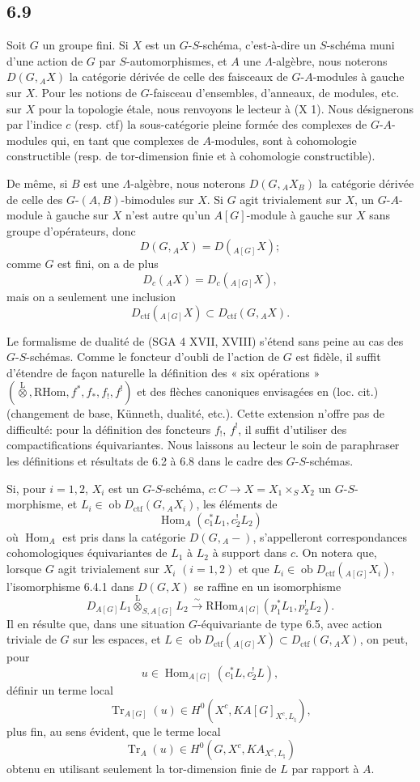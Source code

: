\documentclass[11pt]{article}
\DeclareMathOperator{\Hom}{Hom}
\providecommand{\RHom}{\mathrm{RHom}}
\providecommand{\Tr}{\operatorname{Tr}}
\providecommand{\Tr}{\operatorname{Tr}}
\providecommand{\lten}{\overset{\mathrm L}{\otimes}}
\providecommand{\Ob}{\operatorname{ob}}
\providecommand{\Tr}{\operatorname{Tr}}
\providecommand{\RHom}{\mathrm{RHom}}
\providecommand{\Hom}{\operatorname{Hom}}
\providecommand{\lten}{\overset{\mathrm L}{\otimes}}
\providecommand{\RHom}{\mathrm R\mathcal{H}om}
\providecommand{\lten}{\overset{\mathrm L}{\otimes}}
\providecommand{\Ob}{\operatorname{ob}}
\providecommand{\Tr}{\operatorname{Tr}}
\providecommand{\lten}{\overset{\mathrm L}{\otimes}}
\providecommand{\lten}{\overset{\mathrm L}{\otimes}}
\providecommand{\Ob}{\operatorname{Ob}}
\providecommand{\lten}{\overset{\mathrm L}{\otimes}}
\providecommand{\RHom}{\mathrm{RHom}}
\providecommand{\Hom}{\operatorname{Hom}}
\providecommand{\Tr}{\operatorname{Tr}}
\providecommand{\Ob}{\operatorname{ob}}
\providecommand{\Ob}{\operatorname{Ob}}
\providecommand{\lten}{\overset{\mathrm L}{\otimes}}
\begin{document}
\subsection*{6.9}
Soit $G$ un groupe fini. Si $X$ est un $G$-$S$-schéma, c'est-à-dire un $S$-schéma muni d'une action de $G$ par $S$-automorphismes, et $A$ une $\Lambda$-algèbre, nous noterons $D(G,{}_AX)$ la catégorie dérivée de celle des faisceaux de $G$-$A$-modules à gauche sur $X$. Pour les notions de $G$-faisceau d'ensembles, d'anneaux, de modules, etc. sur $X$ pour la topologie étale, nous renvoyons le lecteur à (X 1). Nous désignerons par l'indice $c$ (resp. ctf) la sous-catégorie pleine formée des complexes de $G$-$A$-modules qui, en tant que complexes de $A$-modules, sont à cohomologie constructible (resp. de tor-dimension finie et à cohomologie constructible).

De même, si $B$ est une $\Lambda$-algèbre, nous noterons $D(G,{}_AX_B)$ la catégorie dérivée de celle des $G$-$(A,B)$-bimodules sur $X$. Si $G$ agit trivialement sur $X$, un $G$-$A$-module à gauche sur $X$ n'est autre qu'un $A[G]$-module à gauche sur $X$ sans groupe d'opérateurs, donc
\[
D(G,{}_AX)=D({}_{A[G]}X);
\]
comme $G$ est fini, on a de plus
\[
D_c({}_AX)=D_c({}_{A[G]}X),
\]
mais on a seulement une inclusion
\[
D_{\mathrm{ctf}}({}_{A[G]}X)\subset D_{\mathrm{ctf}}(G,{}_AX).
\]

Le formalisme de dualité de (SGA 4 XVII, XVIII) s'étend sans peine au cas des $G$-$S$-schémas. Comme le foncteur d'oubli de l'action de $G$ est fidèle, il suffit d'étendre de façon naturelle la définition des « six opérations » $(\lten,\RHom,f^*,f_*,f_!,f^!)$ et des flèches canoniques envisagées en (loc. cit.) (changement de base, Künneth, dualité, etc.). Cette extension n'offre pas de difficulté: pour la définition des foncteurs $f_!$, $f^!$, il suffit d'utiliser des compactifications équivariantes. Nous laissons au lecteur le soin de paraphraser les définitions et résultats de 6.2 à 6.8 dans le cadre des $G$-$S$-schémas.

Si, pour $i=1,2$, $X_i$ est un $G$-$S$-schéma, $c:C\to X=X_1\times_SX_2$ un $G$-$S$-morphisme, et $L_i\in\Ob D_{\mathrm{ctf}}(G,{}_AX_i)$, les éléments de
\[
\Hom_A(c_1^*L_1,c_2^!L_2)
\]
où $\Hom_A$ est pris dans la catégorie $D(G,{}_A-)$, s'appelleront correspondances cohomologiques équivariantes de $L_1$ à $L_2$ à support dans $c$. On notera que, lorsque $G$ agit trivialement sur $X_i$ $(i=1,2)$ et que $L_i\in\Ob D_{\mathrm{ctf}}({}_{A[G]}X_i)$, l'isomorphisme 6.4.1 dans $D(G,X)$ se raffine en un isomorphisme
\[
D_{A[G]}L_1\lten_{S,A[G]}L_2
\xrightarrow{\sim}
\RHom_{A[G]}(p_1^*L_1,p_2^!L_2).
\]
Il en résulte que, dans une situation $G$-équivariante de type 6.5, avec action triviale de $G$ sur les espaces, et $L\in\Ob D_{\mathrm{ctf}}({}_{A[G]}X)\subset D_{\mathrm{ctf}}(G,{}_AX)$, on peut, pour
\[
u\in\Hom_{A[G]}(c_1^*L,c_2^!L),
\]
définir un terme local
\[
\Tr_{A[G]}(u)\in H^0(X^c,KA[G]_{X^c,L_{\natural}}),
\]
plus fin, au sens évident, que le terme local
\[
\Tr_A(u)\in H^0(G,X^c,KA_{X^c,L_{\natural}})
\]
obtenu en utilisant seulement la tor-dimension finie de $L$ par rapport à $A$.
\end{document}
